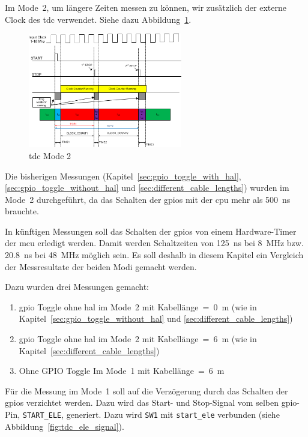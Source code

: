 \documentclass[11pt,a4paper,hidelinks]{article}
\begin{document}
Im Mode~2, um längere Zeiten messen zu können, wir zusätzlich der externe Clock des \acrshort{tdc} verwendet. Siehe dazu
Abbildung~\ref{fig:tdc_mode2}.

\begin{figure}[H]
    \centering
    \includegraphics[width=0.6\textwidth]{graphics/tdc_mode2.png}
    \caption[\acrshort{tdc} Mode 2]{\acrshort{tdc} Mode 2 \cite{ti2016tdc7200_datasheet}}\label{fig:tdc_mode2}
\end{figure}

Die bisherigen Messungen (Kapitel~\ref{sec:gpio_toggle_with_hal}, \ref{sec:gpio_toggle_without_hal} und
\ref{sec:different_cable_lengths}) wurden im Mode~2 durchgeführt, da das Schalten der \acrshort{gpio}s mit der
\acrshort{cpu} mehr als 500~ns brauchte.

In künftigen Messungen soll das Schalten der \acrshort{gpio}s von einem Hardware-Timer der \acrshort{mcu} erledigt
werden. Damit werden Schaltzeiten von 125~ns bei 8~MHz bzw. 20.8~ns bei 48~MHz möglich sein. Es soll deshalb in diesem
Kapitel ein Vergleich der Messresultate der beiden Modi gemacht werden.

Dazu wurden drei Messungen gemacht:
\begin{enumerate}
    \item \acrshort{gpio} Toggle ohne \acrshort{hal} im Mode~2 mit Kabellänge~=~0~m (wie in Kapitel~\ref{sec:gpio_toggle_without_hal} und \ref{sec:different_cable_lengths})
    \item \acrshort{gpio} Toggle ohne \acrshort{hal} im Mode~2 mit Kabellänge~=~6~m (wie in Kapitel~\ref{sec:different_cable_lengths})
    \item Ohne GPIO Toggle Im Mode~1 mit Kabellänge~=~6~m
\end{enumerate}

Für die Messung im Mode~1 soll auf die Verzögerung durch das Schalten der \acrshort{gpio}s verzichtet werden. Dazu wird
das Start- und Stop-Signal vom selben \acrshort{gpio}-Pin, \lstinline|START_ELE|, generiert. Dazu wird \lstinline|SW1|
mit \lstinline|start_ele| verbunden (siehe Abbildung~\ref{fig:tdc_ele_signal}).
\end{document}

